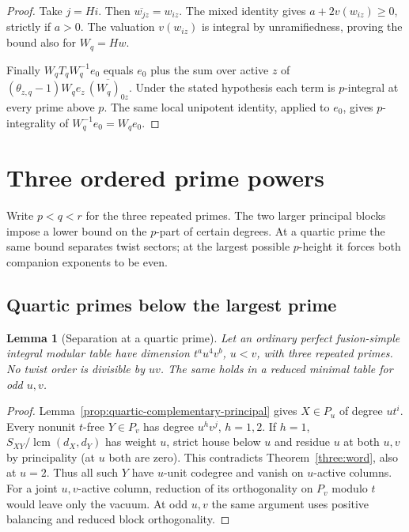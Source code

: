 \documentclass[11pt,a4paper]{article}
\numberwithin{equation}{section}
\newtheorem{lemma}[theorem]{Lemma}
\theoremstyle{remark}
\newcommand{\lcm}{\operatorname{lcm}}
\begin{document}
\begin{proof}
Take $j=Hi$. Then $\overline{w_{jz}}=w_{iz}$. The mixed identity
gives $a+2v(w_{iz})\ge0$, strictly if $a>0$. The valuation
$v(w_{iz})$ is integral by unramifiedness, proving the bound also
for $W_q=Hw$.

Finally $W_qT_qW_q^{-1}e_0$ equals $e_0$ plus the sum over active
$z$ of $(\theta_{z,q}-1) W_q e_z\,\overline{(W_q)_{0z}}$.
Under the stated hypothesis each term is $p$-integral at every
prime above $p$. The same local unipotent identity, applied to
$e_0$, gives $p$-integrality of $W_q^{-1}e_0=W_qe_0$.
\end{proof}

\section{Three ordered prime powers}\label{fam:M:sec:7}\label{sec:three-ordered}
Write $p<q<r$ for the three repeated primes. The two larger principal blocks impose a lower bound on the $p$-part of certain degrees. At a quartic prime the same bound separates twist sectors; at the largest possible $p$-height it forces both companion exponents to be even.

\subsection{Quartic primes below the largest prime}\label{fam:M:sec:7.1}

\begin{lemma}[Separation at a quartic prime]\label{fam:M:7.1}\label{first:separate}
Let an ordinary perfect fusion-simple integral modular table have dimension $t^a u^4v^b$, $u<v$, with three repeated primes. No twist order is divisible by $uv$. The same holds in a reduced minimal table for odd $u,v$.
\end{lemma}
\begin{proof}
Lemma~\ref{prop:quartic-complementary-principal} gives $X\in P_u$ of degree $ut^i$. Every nonunit $t$-free $Y\in P_v$ has degree $u^hv^j$, $h=1,2$. If $h=1$, $S_{XY}/\lcm(d_X,d_Y)$ has weight $u$, strict house below $u$ and residue $u$ at both $u,v$ by principality (at $u$ both are zero). This contradicts Theorem~\ref{three:word}, also at $u=2$. Thus all such $Y$ have $u$-unit codegree and vanish on $u$-active columns. For a joint $u,v$-active column, reduction of its orthogonality on $P_v$ modulo $t$ would leave only the vacuum. At odd $u,v$ the same argument uses positive balancing and reduced block orthogonality.
\end{proof}
\end{document}
